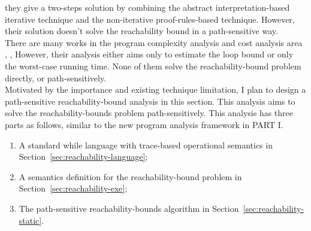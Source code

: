  they give a two-steps solution by combining the abstract interpretation-based iterative technique
 and the non-iterative proof-rules-based technique.
 However, their solution doesn't solve the reachability
 bound in a path-sensitive way.
 \\
 There are many works in the program complexity analysis and cost analysis area
 \cite{GustafssonEL05, HumenbergerJK18}, 
 \cite{BrockschmidtEFFG16,AlbertAGP08,AliasDFG10,Flores-MontoyaH14}, 
 However, their analysis either aims only to estimate the loop bound
 or only the worst-case running time.
 None of them solve the reachability-bound problem directly, or path-sensitively.
 \\
 Motivated by the importance and existing technique limitation,
 I plan to design a path-sensitive reachability-bound analysis in this section.
 This analysis aims to solve the 
 reachability-bounds problem path-sensitively.
 This analysis has three parts as follows, similar to the new program analysis framework in PART I.
 \begin{enumerate}
 \item A standard while language with trace-based operational semantics in Section~\ref{sec:reachability-language};
 \item A semantics definition for the reachability-bound problem in Section~\ref{sec:reachability-exe};
 \item The path-sensitive reachability-bounds algorithm in Section~\ref{sec:reachability-static}.
 \end{enumerate}
